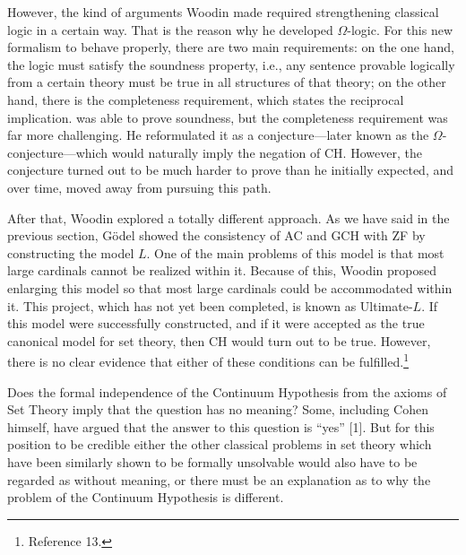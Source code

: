 \documentclass[11pt,a4paper]{book}
\theoremstyle{plain}
\begin{document}
However, the kind of arguments Woodin made required strengthening classical logic in a certain way. That is the reason why he developed $\Omega$-logic. For this new formalism to behave properly, there are two main requirements: on the one hand, the logic must satisfy the soundness property, i.e., any sentence provable logically from a certain theory must be true in all structures of that theory; on the other hand, there is the completeness requirement, which states the reciprocal implication. \textcite[p.~7]{woodin2004} was able to prove soundness, but the completeness requirement was far more challenging. He reformulated it as a conjecture---later known as the $\Omega$-conjecture---which would naturally imply the negation of CH. However, the conjecture turned out to be much harder to prove than he initially expected, and over time, \textcite{woodin2004} moved away from pursuing this path.

After that, Woodin explored a totally different approach. As we have said in the previous section, Gödel showed the consistency of AC and GCH with ZF by constructing the model $L$. One of the main problems of this model is that most large cardinals cannot be realized within it. Because of this, Woodin proposed enlarging this model so that most large cardinals could be accommodated within it. This project, which has not yet been completed, is known as Ultimate-$L$. If this model were successfully constructed, and if it were accepted as the true canonical model for set theory, then CH would turn out to be true. However, there is no clear evidence that either of these conditions can be fulfilled.\footnote{Reference 13.}

Does the formal independence of the Continuum Hypothesis from the axioms of Set Theory imply that the question has no meaning? Some, including Cohen himself, have argued that the answer to this question is “yes” [1]. But for this position to be credible either the other classical problems in set theory which have been similarly shown to be formally unsolvable would also have to be regarded as without meaning, or there must be an explanation as to why the problem of the Continuum Hypothesis is different. \textcite[p. 29]{woodin2004}
\end{document}
